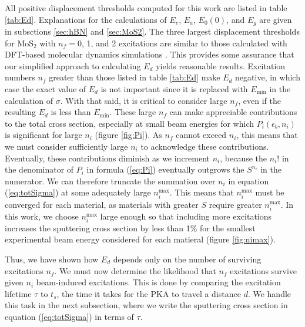 \documentclass{article}
\begin{document}
All positive displacement thresholds computed for this work are listed in table
\ref{tab:Ed}.
Explanations for the calculations of $E_v$, $E_a$, $E_0(0)$, and $E_g$ are
given in subsctions \ref{sec:hBN} and \ref{sec:MoS2}.
The three largest displacement thresholds for MoS$_2$ with $n_f = 0$, 1, and 2
excitations are similar to those calculated with DFT-based molecular dynamics
simulations \cite{Kretschmer2020}.
This provides some assurance that our simplified approach to calculating $E_d$
yields reasonable results.
Excitation numbers $n_f$ greater than those listed in table \ref{tab:Ed} make
$E_d$ negative, in which case the exact value of $E_d$ is not important since
it is replaced with $E_\text{min}$ in the calculation of $\sigma$.
With that said, it is critical to consider large $n_f$, even if the resulting
$E_d$ is less than $E_\text{min}$.
These large $n_f$ can make appreciable contributions to the total
cross section, especially at small beam energies for which $P_i(\epsilon_b,
n_i)$ is significant for large $n_i$ (figure \ref{fig:Pi}).
As $n_f$ cannot exceed $n_i$, this means that we must consider sufficiently
large $n_i$ to acknowledge these contributions.
Eventually, these contributions diminish as we increment $n_i$, because the
$n_i!$ in the denominator of $P_i$ in formula (\ref{eq:Pi}) eventually
outgrows the $S^{n_i}$ in the numerator.
We can therefore truncate the summation over $n_i$ in equation
(\ref{eq:totSigma}) at some adequately large $n_i^\text{max}$.
This means that $n_i^\text{max}$ must be converged for each material, as
materials with greater $S$ require greater $n_i^\text{max}$.
In this work, we choose $n_i^\text{max}$ large enough so that including more
excitations increases the sputtering cross section by less than 1\% for the
smallest experimental beam energy considered for each matieral (figure
\ref{fig:nimax}).

Thus, we have shown how $E_d$ depends only on the number of surviving
excitations $n_f$.  We must now determine the likelihood that $n_f$ excitations
survive given $n_i$ beam-induced excitations.
This is done by comparing the excitation lifetime $\tau$ to $t_s$, the time it
takes for the PKA to travel a distance $d$.
We handle this task in the next subsection, where we write the sputtering
cross section in equation (\ref{eq:totSigma}) in terms of
$\tau$.
\end{document}
